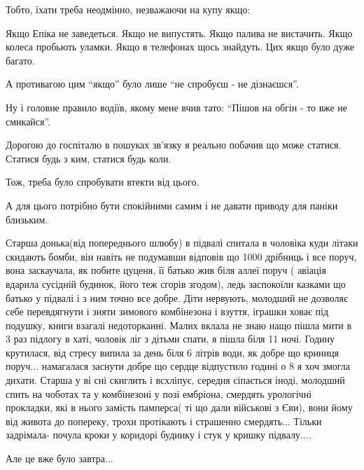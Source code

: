 \begin{itemize}
Тобто, їхати треба неодмінно, незважаючи на купу якщо:

\obeycr
Якщо Епіка не заведеться.
Якщо не випустять.
Якщо палива не вистачить.
Якщо колеса пробьють уламки.
Якщо в телефонах щось знайдуть.
Цих якщо було дуже багато.
\restorecr

А противагою цим \enquote{якщо} було лише \enquote{не спробуєш - не дізнаєшся}.

Ну і головне правило водіїв, якому мене вчив тато: \enquote{Пішов на обгін - то вже не
смикайся}.

Дорогою до госпіталю в пошуках зв'язку я реально побачив що може статися.
Статися будь з ким, статися будь коли.

Тож, треба було спробувати втекти від цього.

А для цього потрібно бути спокійними самим і не давати приводу для паніки
близьким.

\end{itemize} %


Старша донька(від попереднього шлюбу) в підвалі спитала в чоловіка куди літаки
скидають бомби, він навіть не подумавши відповів що 1000 дрібниць і все поруч,
вона заскаучала, як побите цуценя, її батько жив біля аллеї поруч ( авіація
вдарила сусідній будинок, його теж сгорів згодом), ледь заспокоїли казками що
батько у підвалі і з ним точно все добре. Діти нервують, молодший не дозволяє
себе перевдягнути і зняти зимового комбінезона і взуття, іграшки ховає під
подушку, книги взагалі недоторканні. Малих вклала не знаю нащо пішла мити в 3
раз підлогу в хаті, чоловік ліг з дітьми спати, я пішла біля 11 ночі. Годину
крутилася, від стресу випила за день біля 6 літрів води, як добре що криниця
поруч... намагалася заснути добре що сердце відпустило годині о 8 я хоч змогла
дихати. Старша у ві сні скиглить і всхліпує, середня сіпається іноді, молодший
спить на чоботах та у комбінезоні у позі ембріона, смердять урологічні
прокладки, які в нього замість памперса( ті що дали військові з Єви), вони йому
від живота до попереку, трохи протікають і страшенно смердять... Тільки
задрімала- почула кроки у коридорі будинку і стук у кришку підвалу....

Але це вже було завтра...

